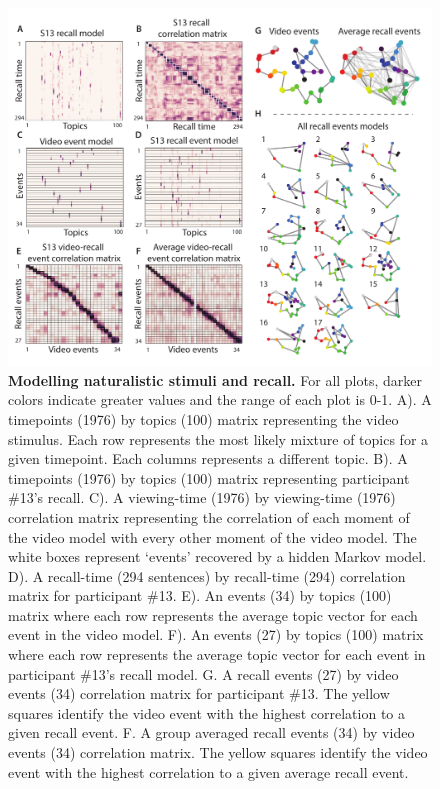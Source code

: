 \documentclass{article}
\begin{document}
{\begin{figure}[ht!]
\centering
\includegraphics[width=\textwidth]{figs/2_eventseg.pdf}
\caption{\small \textbf{Modelling naturalistic stimuli and recall.} For all plots, darker colors indicate greater values and the range of each plot is 0-1.  A). A timepoints (1976) by topics (100) matrix representing the video stimulus.  Each row represents the most likely mixture of topics for a given timepoint. Each columns represents a different topic. B). A timepoints (1976) by topics (100) matrix representing participant \#13's recall. C). A viewing-time (1976) by viewing-time (1976) correlation matrix representing the correlation of each moment of the video model with every other moment of the video model. The white boxes represent `events' recovered by a hidden Markov model. D). A recall-time (294 sentences) by recall-time (294) correlation matrix for participant \#13. E). An events (34) by topics (100) matrix where each row represents the average topic vector for each event in the video model.  F). An events (27) by topics (100) matrix where each row represents the average topic vector for each event in participant \#13's recall model. G. A recall events (27) by video events (34) correlation matrix for participant \#13. The yellow squares identify the video event with the highest correlation to a given recall event. F. A group averaged recall events (34) by video events (34) correlation matrix.  The yellow squares identify the video event with the highest correlation to a given average recall event.}
\label{fig:model}
\end{figure}


}
\end{document}
